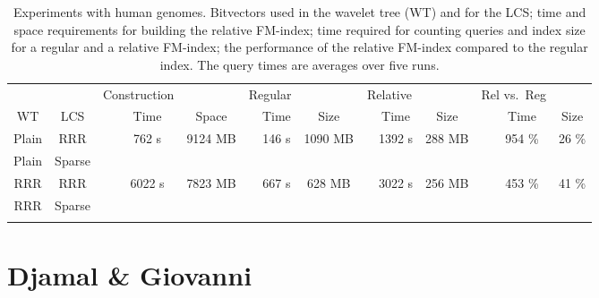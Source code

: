 \documentclass{llncs}
\begin{document}
\begin{table}
\centering
\caption{Experiments with human genomes. Bitvectors used in the wavelet tree (WT) and for the LCS; time and space requirements for building the relative FM-index; time required for counting queries and index size for a regular and a relative FM-index; the performance of the relative FM-index compared to the regular index. The query times are averages over five runs.}\label{table:experiments}
\begin{tabular}{cccccccccccccc}
\hline
\noalign{\smallskip}
\multicolumn{2}{c}{Bitvectors} & & \multicolumn{2}{c}{Construction} & & \multicolumn{2}{c}{Regular} & & \multicolumn{2}{c}{Relative} & & \multicolumn{2}{c}{Rel vs.~Reg} \\
WT & LCS & & Time & Space & & Time & Size & & Time & Size & & Time & Size \\
\noalign{\smallskip}
\hline
\noalign{\smallskip}
Plain & RRR    & &  762 s & 9124 MB & & 146 s & 1090 MB & & 1392 s & 288 MB & & 954 \% & 26 \% \\
\noalign{\smallskip}
Plain & Sparse & & \\
\noalign{\smallskip}
RRR   & RRR    & & 6022 s & 7823 MB & & 667 s &  628 MB & & 3022 s & 256 MB & & 453 \% & 41 \% \\
\noalign{\smallskip}
RRR   & Sparse & & \\
\noalign{\smallskip}
\hline
\end{tabular}
\end{table}


\section{Djamal \& Giovanni}
\label{sec:djamal&giovanni}




\end{document}
